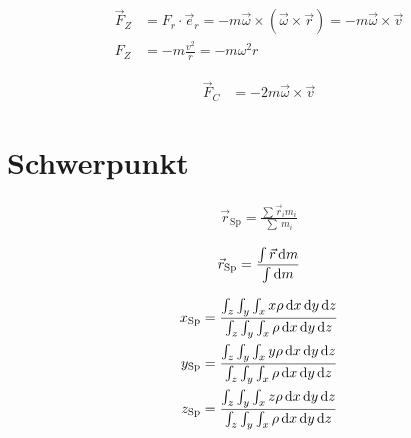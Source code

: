 \begin{boxleft}
\end{boxleft}\begin{boxrightshaded}
\begin{align}
\vec{F}_Z&=F_r\cdot \vec{e}_r=-m\vec{\omega}\times\left(\vec{\omega}\times\vec{r}\right)=-m\vec{\omega}\times\vec{v}\\
  F_Z&=-m\frac{v^2}{r}=-m\omega^2 r
\end{align}
\end{boxrightshaded}

\begin{boxleft}
\end{boxleft}\begin{boxrightshaded}
\begin{align}
\vec{F}_C&=-2m\vec{\omega}\times\vec{v}
\end{align}
\end{boxrightshaded}

\section{Schwerpunkt}

\begin{boxleft}
\end{boxleft}\begin{boxrightshaded}
\begin{align}
\vec{r}_{\text{Sp}}=\frac{\sum\vec{r}_i m_i}{\sum\ m_i}
\end{align}
\end{boxrightshaded}

\begin{boxleft}
\end{boxleft}\begin{boxrightshaded}
\begin{align}
\vec{r}_{\text{Sp}}=\frac{\int \vec{r}\mathop{}\!\mathrm{d} m}{\int \mathop{}\!\mathrm{d} m}
\end{align}
\end{boxrightshaded}

\begin{boxleft}
\end{boxleft}\begin{boxrightshaded}
\begin{align}
x_{\text{Sp}}&=\frac{\int_z\int_y\int_x x\rho \diff x \diff y \diff z }{\int_z\int_y\int_x \rho \diff x \diff y \diff z }\\
y_{\text{Sp}}&=\frac{\int_z\int_y\int_x y\rho \diff x \diff y \diff z }{\int_z\int_y\int_x \rho \diff x \diff y \diff z }\\
z_{\text{Sp}}&=\frac{\int_z\int_y\int_x z\rho \diff x \diff y \diff z }{\int_z\int_y\int_x \rho \diff x \diff y \diff z }
\end{align}
\end{boxrightshaded}

